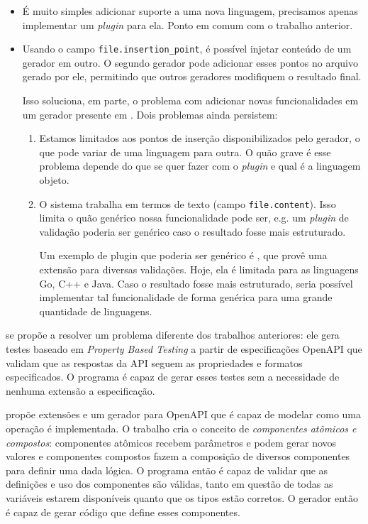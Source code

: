 \begin{itemize}
\item
  É muito simples adicionar suporte a uma nova linguagem, precisamos apenas
  implementar um \textit{plugin} para ela. Ponto em comum com o trabalho anterior.
\item
  Usando o campo \texttt{file.insertion\_point}, é possível injetar conteúdo
  de um gerador em outro. O segundo gerador pode adicionar esses pontos no
  arquivo gerado por ele, permitindo que outros geradores modifiquem o resultado
  final.

  Isso soluciona, em parte, o problema com adicionar novas funcionalidades em
  um gerador presente em \cite{openapi:gen}. Dois problemas ainda persistem:

  \begin{enumerate}
  \item
    Estamos limitados aos pontos de inserção disponibilizados pelo gerador, o
    que pode variar de uma linguagem para outra. O quão grave é esse problema
    depende do que se quer fazer com o \textit{plugin} e qual é a linguagem objeto.
  \item
    O sistema trabalha em termos de texto (campo \texttt{file.content}). Isso
    limita o quão genérico nossa funcionalidade pode ser, e.g. um \textit{plugin} de
    validação poderia ser genérico caso o resultado fosse mais estruturado.

    Um exemplo de plugin que poderia ser genérico é \cite{envoy:protoc-gen-validate},
    que provê uma extensão para diversas validações. Hoje, ela é limitada para
    as linguagens Go, C++ e Java. Caso o resultado fosse mais estruturado, seria
    possível implementar tal funcionalidade de forma genérica para uma grande
    quantidade de linguagens.
  \end{enumerate}
\end{itemize}

\cite{9159071} se propõe a resolver um problema diferente dos trabalhos anteriores:
ele gera testes baseado em \textit{Property Based Testing} \cite{10.1145/351240.351266}
a partir de especificações OpenAPI que validam que as respostas da API seguem as
propriedades e formatos especificados. O programa é capaz de gerar esses testes
sem a necessidade de nenhuma extensão a especificação.

\cite{sferruzza:hal-01868498} propõe extensões e um gerador para OpenAPI que é
capaz de modelar como uma operação é implementada. O trabalho cria o conceito de
\textit{componentes atômicos e compostos}: componentes atômicos recebem parâmetros
e podem gerar novos valores e componentes compostos fazem a composição de diversos
componentes para definir uma dada lógica. O programa então é capaz de validar que
as definições e uso dos componentes são válidas, tanto em questão de todas as
variáveis estarem disponíveis quanto que os tipos estão corretos. O gerador então
é capaz de gerar código que define esses componentes.

